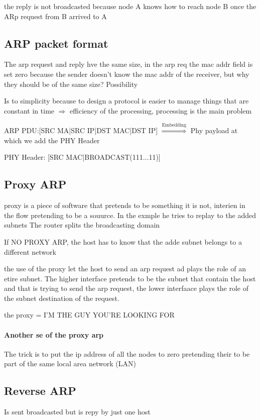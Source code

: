 the reply is not broadcasted because node A knows how to reach node B once the ARp request from B arrived to A

\subsection{ARP packet format}
The arp request and reply hve the same size, in the arp req the mac addr field is set zero because the sender doesn't know the mac addr of the receiver, but why they should be of the same size? Possibility

Is to simplicity because to design a protocol is easier to manage things that are constant in time $\Rightarrow$ efficiency of the processing, processing is the main problem 

ARP PDU:[SRC MA|SRC IP|DST MAC|DST IP] $\stackrel{\text{Embedding}}{\Rightarrow}$ Phy payload at which we add the PHY Header

PHY Header: [SRC MAC|BROADCAST(111...11)]

\subsection{Proxy ARP}
proxy is a piece of software that pretends to be something it is not, interien in the flow pretending to be a souurce. 
In the exmple he tries to replay to the added subnets 
The router splits the broadcasting domain 

If NO PROXY ARP, the host has to know that the adde subnet belongs to a different network 

the use of the proxy let the host to send an arp request ad plays the role of an etire subnet. The higher interface pretends to be the subnet that contain the host and that is trying to send the arp request, the lower interfaace plays the role of the subnet destination of the request. 

the proxy = I'M THE GUY YOU'RE LOOKING FOR

\paragraph{Another se of the proxy arp}
The trick is to put the ip address of all the nodes to zero pretending their to be part of the same local area network (LAN)

\subsection{Reverse ARP}
Is sent broadcasted but is repy by just one host

